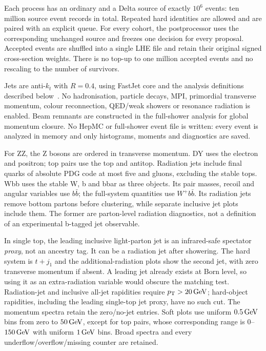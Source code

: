 Each process has an ordinary and a Delta source of exactly $10^6$
events: ten million source event records in total. Repeated hard identities
are allowed and are paired with an explicit queue. For every cohort,
the postprocessor uses the corresponding unchanged source and freezes
one decision for every proposal. Accepted events are shuffled into a
single LHE file and retain their original signed cross-section weights.
There is no top-up to one million accepted events and no rescaling to the
number of survivors.

Jets are anti-$k_t$ with $R=0.4$, using FastJet core
and the analysis definitions described below~\cite{AntiKt,FastJet}.
No hadronisation, particle decays, MPI, primordial transverse momentum,
colour reconnection, QED/weak showers or resonance radiation is enabled.
Beam remnants are constructed in the full-shower analysis for global
momentum closure. No HepMC or full-shower event file is written: every
event is analyzed in memory and only histograms, moments and diagnostics
are saved.

For ZZ, the Z bosons are ordered in transverse momentum. DY uses the
electron and positron; top pairs use the top and antitop. Radiation jets
include final quarks of absolute PDG code at most five and gluons,
excluding the stable tops. Wbb uses the stable W, b and bbar as three
objects. Its pair masses, recoil and angular variables use $b\bar b$;
the full-system quantities use $W^+b\bar b$. Its radiation jets remove
bottom partons before clustering, while separate inclusive jet plots
include them. The former are parton-level radiation diagnostics, not a
definition of an experimental b-tagged jet observable.

In single top, the leading inclusive light-parton jet is an
infrared-safe spectator \emph{proxy}, not an ancestry tag. It can be a
radiation jet after showering. The hard system is $t+j_1$ and the
additional-radiation plots show the second jet, with zero transverse
momentum if absent. A leading jet already exists at Born level, so using
it as an extra-radiation variable would obscure the matching test.
Radiation-jet and inclusive all-jet rapidities require $p_{\mathrm T}>20\,\mathrm{GeV}$;
hard-object rapidities, including the leading single-top jet proxy, have
no such cut. The momentum spectra retain
the zero/no-jet entries. Soft plots use uniform $0.5\,\mathrm{GeV}$ bins from zero
to $50\,\mathrm{GeV}$, except for top pairs, whose corresponding range is
$0$--$150\,\mathrm{GeV}$ with uniform $1\,\mathrm{GeV}$ bins. Broad spectra and every
underflow/overflow/missing counter are retained.

